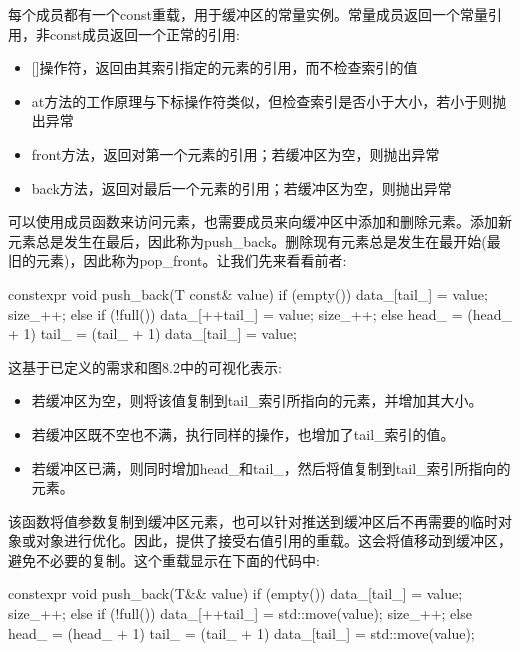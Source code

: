 每个成员都有一个const重载，用于缓冲区的常量实例。常量成员返回一个常量引用，非const成员返回一个正常的引用:

\begin{itemize}
\item
{}[]操作符，返回由其索引指定的元素的引用，而不检查索引的值

\item
at方法的工作原理与下标操作符类似，但检查索引是否小于大小，若小于则抛出异常

\item
front方法，返回对第一个元素的引用；若缓冲区为空，则抛出异常

\item
back方法，返回对最后一个元素的引用；若缓冲区为空，则抛出异常
\end{itemize}

可以使用成员函数来访问元素，也需要成员来向缓冲区中添加和删除元素。添加新元素总是发生在最后，因此称为push\_back。删除现有元素总是发生在最开始(最旧的元素)，因此称为pop\_front。让我们先来看看前者:

\begin{cpp}
constexpr void push_back(T const& value)
{
	if (empty())
	{
		data_[tail_] = value;
		size_++;
	}
	else if (!full())
	{
		data_[++tail_] = value;
		size_++;
	}
	else
	{
		head_ = (head_ + 1) %
		tail_ = (tail_ + 1) %
		data_[tail_] = value;
	}
}
\end{cpp}

这基于已定义的需求和图8.2中的可视化表示:

\begin{itemize}
\item
若缓冲区为空，则将该值复制到tail\_索引所指向的元素，并增加其大小。

\item
若缓冲区既不空也不满，执行同样的操作，也增加了tail\_索引的值。

\item
若缓冲区已满，则同时增加head\_和tail\_，然后将值复制到tail\_索引所指向的元素。
\end{itemize}

该函数将值参数复制到缓冲区元素，也可以针对推送到缓冲区后不再需要的临时对象或对象进行优化。因此，提供了接受右值引用的重载。这会将值移动到缓冲区，避免不必要的复制。这个重载显示在下面的代码中:

\begin{cpp}
constexpr void push_back(T&& value)
{
	if (empty())
	{
		data_[tail_] = value;
		size_++;
	}
	else if (!full())
	{
		data_[++tail_] = std::move(value);
		size_++;
	}
	else
	{
	head_ = (head_ + 1) %
	tail_ = (tail_ + 1) %
	data_[tail_] = std::move(value);
	}
}
\end{cpp}

